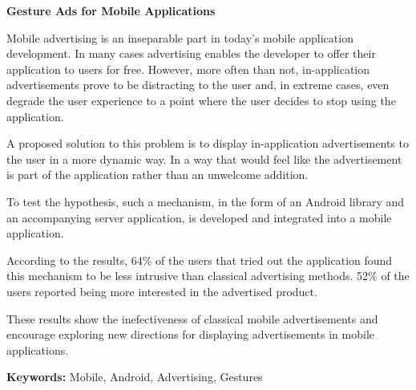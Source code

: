\begin{abstracts}

\textbf{Gesture Ads for Mobile Applications}

Mobile advertising is an inseparable part in today's mobile application development. In many cases advertising enables the developer to offer their application to users for free. However, more often than not, in-application advertisements prove to be distracting to the user and, in extreme cases, even degrade the user experience to a point where the user decides to stop using the application.

A proposed solution to this problem is to display in-application advertisements to the user in a more dynamic way. In a way that would feel like the advertisement is part of the application rather than an unwelcome addition.

To test the hypothesis, such a mechanism, in the form of an Android library and an accompanying server application, is developed and integrated into a mobile application.

According to the results, 64\% of the users that tried out the application found this mechanism to be less intrusive than classical advertising methods. 52\% of the users reported being more interested in the advertised product.

These results show the inefectiveness of classical mobile advertisements and encourage exploring new directions for displaying advertisements in mobile applications.

\bigskip

\textbf{Keywords:} Mobile, Android, Advertising, Gestures

\end{abstracts}